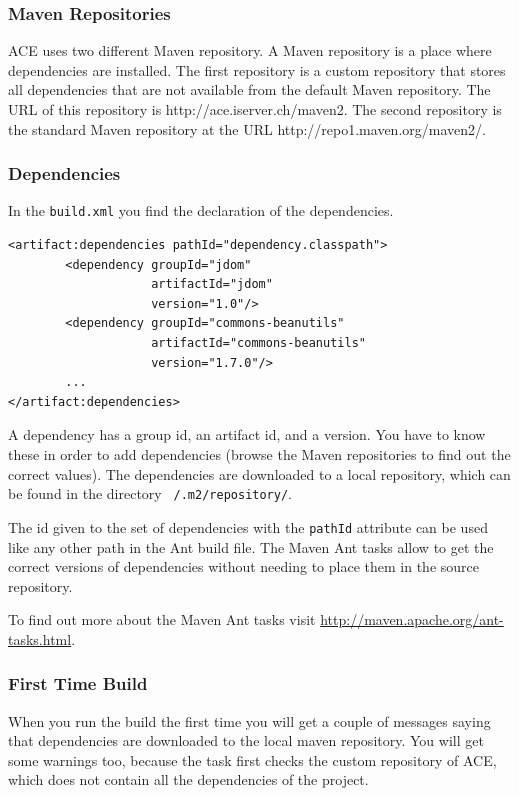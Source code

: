 \documentclass[11pt,a4paper]{article}
\begin{document}
\subsubsection{Maven Repositories}
ACE uses two different Maven repository. A Maven repository is a place where
dependencies are installed. The first repository is a custom repository that
stores all dependencies that are not available from the default Maven
repository. The URL of this repository is http://ace.iserver.ch/maven2. The
second repository is the standard Maven repository at the URL
http://repo1.maven.org/maven2/.

\subsubsection{Dependencies}
In the \texttt{build.xml} you find the declaration of the dependencies.

\small{
\begin{verbatim}
<artifact:dependencies pathId="dependency.classpath">
		<dependency groupId="jdom" 
		            artifactId="jdom" 
		            version="1.0"/>
		<dependency groupId="commons-beanutils" 
		            artifactId="commons-beanutils" 
		            version="1.7.0"/>
        ...
</artifact:dependencies>
\end{verbatim}
}

A dependency has a group id, an artifact id, and a version. You have to know
these in order to add dependencies (browse the Maven repositories to find
out the correct values). The dependencies are downloaded to a local repository,
which can be found in the directory \texttt{~/.m2/repository/}.

The id given to the set of dependencies with the \texttt{pathId} attribute
can be used like any other path in the Ant build file. The Maven Ant tasks
allow to get the correct versions of dependencies without needing to place
them in the source repository.

To find out more about the Maven Ant tasks visit
\href{http://maven.apache.org/ant-tasks.html}{http://maven.apache.org/ant-tasks.html}.

\subsubsection{First Time Build}
When you run the build the first time you will get a couple of messages saying that dependencies are downloaded to the local maven repository. You will get 
some warnings too, because the task first checks the custom
repository of ACE, which does not contain all the dependencies of the project.
\end{document}
